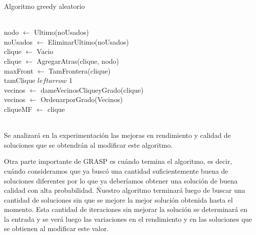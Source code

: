 \begin{algorithm}[H]
\begin{algorithmic}
\caption{Algoritmo greedy aleatorio}
		\State{}\\
		nodo $\leftarrow$ Ultimo(noUsados)\\
		noUsados $\leftarrow$ EliminarUltimo(noUsados)\\
		clique $\leftarrow$ Vacio\\
		clique $\leftarrow$ AgregarAtras(clique, nodo)\\
		maxFront $\leftarrow$ TamFrontera(clique)\\
		tamClique $leftarrow$ 1\\
		vecinos $\leftarrow$ dameVecinosCliqueyGrado(clique)\\
		vecinos $\leftarrow$ OrdenarporGrado(Vecinos)\\
		cliqueMF $\leftarrow$ clique\\
		 \\
	\EndFunction
\end{algorithmic}
\end{algorithm} 

Se analizará en la experimentación las mejoras en rendimiento y calidad de soluciones que se obtendrán al modificar este algoritmo.

Otra parte importante de GRASP es cuándo termina el algoritmo, es decir, cuándo consideramos que ya buscó una cantidad suficientemente buena de soluciones diferentes por lo que ya deberíamos obtener una solución de buena calidad con alta probabilidad. Ńuestro algoritmo terminará luego de buscar una cantidad de soluciones sin que se mejore la mejor solución obtenida hasta el momento. Esta cantidad de iteraciones sin mejorar la solución se determinará en la entrada y se verá luego las variaciones en el rendimiento y en las soluciones que se obtienen al modificar este valor.

